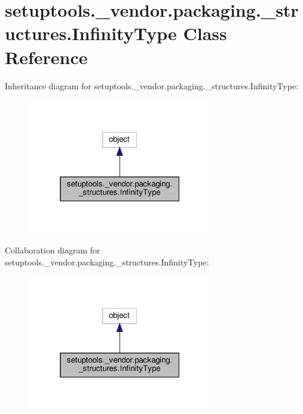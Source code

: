 \hypertarget{classsetuptools_1_1__vendor_1_1packaging_1_1__structures_1_1InfinityType}{}\section{setuptools.\+\_\+vendor.\+packaging.\+\_\+structures.\+Infinity\+Type Class Reference}
\label{classsetuptools_1_1__vendor_1_1packaging_1_1__structures_1_1InfinityType}


Inheritance diagram for setuptools.\+\_\+vendor.\+packaging.\+\_\+structures.\+Infinity\+Type\+:
\nopagebreak
\begin{figure}[H]
\begin{center}
\leavevmode
\includegraphics[width=229pt]{classsetuptools_1_1__vendor_1_1packaging_1_1__structures_1_1InfinityType__inherit__graph}
\end{center}
\end{figure}


Collaboration diagram for setuptools.\+\_\+vendor.\+packaging.\+\_\+structures.\+Infinity\+Type\+:
\nopagebreak
\begin{figure}[H]
\begin{center}
\leavevmode
\includegraphics[width=229pt]{classsetuptools_1_1__vendor_1_1packaging_1_1__structures_1_1InfinityType__coll__graph}
\end{center}
\end{figure}
